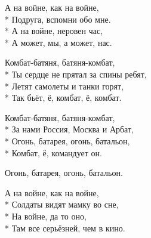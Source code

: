 \medskip

\begin{minipage}{\linewidth}
А на войне, как на войне,\\*
Подруга, вспомни обо мне.\\*
А на войне, неровен час,\\*
А может, мы, а может, нас.\\
\end{minipage}\par\medskip\nobreak

\medskip

\begin{minipage}{\linewidth}
\hspace*{1.5em}Комбат-батяня, батяня-комбат,\\*
\hspace*{1.5em}Ты сердце не прятал за спины ребят,\\*
\hspace*{1.5em}Летят самолеты и танки горят,\\*
\hspace*{1.5em}Так бьёт, ё, комбат, ё, комбат.\\
\end{minipage}\par\medskip\nobreak

\medskip

\begin{minipage}{\linewidth}
\hspace*{1.5em}Комбат-батяня, батяня-комбат,\\*
\hspace*{1.5em}За нами Россия, Москва и Арбат,\\*
\hspace*{1.5em}Огонь, батарея, огонь, батальон,\\*
\hspace*{1.5em}Комбат, ё, командует он.\\
\end{minipage}\par\medskip\nobreak

\medskip

\begin{minipage}{\linewidth}
\hspace*{1.5em}Огонь, батарея, огонь, батальон.\\
\end{minipage}\par\medskip\nobreak

\medskip

\begin{minipage}{\linewidth}
А на войне, как на войне,\\*
Солдаты видят мамку во сне,\\*
На войне, да то оно,\\*
Там все серьёзней, чем в кино.\\
\end{minipage}\par\medskip\nobreak


